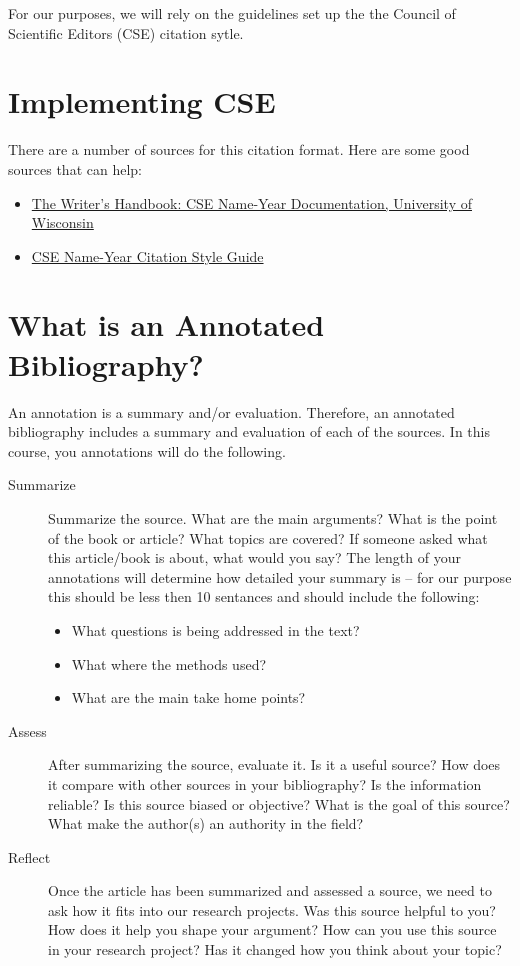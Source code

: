 \documentclass{article}\usepackage[]{graphicx}\usepackage[]{color}
\begin{document}
For our purposes, we will rely on the guidelines set up the the Council of Scientific Editors (CSE) citation sytle. 

\section{Implementing CSE}

There are a number of sources for this citation format. Here are some good sources that can help:

\begin{itemize}
  \item \href{https://writing.wisc.edu/Handbook/DocCSE_NameYear.html}{The Writer's Handbook: CSE Name-Year Documentation, University of Wisconsin}

  \item \href{https://www.mcgill.ca/library/files/library/cse-name-year-citation-style-guide.pdf}{CSE Name-Year Citation Style Guide}
\end{itemize}

\section{What is an Annotated Bibliography?}

An annotation is a summary and/or evaluation. Therefore, an annotated bibliography includes a summary and evaluation of each of the sources. In this course, you annotations will do the following.

\begin{description}
  \item[Summarize] Summarize the source. What are the main arguments? What is the point of the book or article? What topics are covered? If someone asked what this article/book is about, what would you say? The length of your annotations will determine how detailed your summary is -- for our purpose this should be less then 10 sentances and should include the following:
  
\begin{itemize}
  \item What questions is being addressed in the text?
  \item What where the methods used?
  \item What are the main take home points?  
\end{itemize}

\item[Assess] After summarizing the source, evaluate it. Is it a useful source? How does it compare with other sources in your bibliography? Is the information reliable? Is this source biased or objective? What is the goal of this source? What make the author(s) an authority in the field?

\item[Reflect] Once the article has been summarized and assessed a source, we need to ask how it fits into our research projects. Was this source helpful to you? How does it help you shape your argument? How can you use this source in your research project? Has it changed how you think about your topic? 

\end{description}
\end{document}
